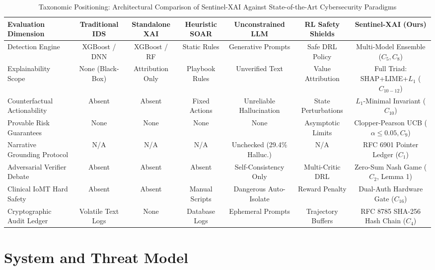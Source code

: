 \documentclass{ieeeaccess}
\begin{document}
\begin{table}[t]
\centering
\caption{Taxonomic Positioning: Architectural Comparison of Sentinel-XAI Against State-of-the-Art Cybersecurity Paradigms}
\label{tab:positioning}
\begin{tabular}{lcccccc}
\toprule
\textbf{Evaluation Dimension} & \textbf{Traditional IDS} & \textbf{Standalone XAI} & \textbf{Heuristic SOAR} & \textbf{Unconstrained LLM} & \textbf{RL Safety Shields} & \textbf{Sentinel-XAI (Ours)} \\
\midrule
Detection Engine & XGBoost / DNN & XGBoost / RF & Static Rules & Generative Prompts & Safe DRL Policy & Multi-Model Ensemble ($C_5, C_8$) \\
Explainability Scope & None (Black-Box) & Attribution Only & Playbook Rules & Unverified Text & Value Attribution & Full Triad: SHAP+LIME+$L_1$ ($C_{10-12}$) \\
Counterfactual Actionability & Absent & Absent & Fixed Actions & Unreliable Hallucination & State Perturbations & $L_1$-Minimal Invariant ($C_{10}$) \\
Provable Risk Guarantees & None & None & None & None & Asymptotic Limits & Clopper-Pearson UCB ($\alpha \le 0.05, C_9$) \\
Narrative Grounding Protocol & N/A & N/A & N/A & Unchecked (29.4\% Halluc.) & N/A & RFC 6901 Pointer Ledger ($C_1$) \\
Adversarial Verifier Debate & Absent & Absent & Absent & Self-Consistency Only & Multi-Critic DRL & Zero-Sum Nash Game ($C_2$, Lemma 1) \\
Clinical IoMT Hard Safety & Absent & Absent & Manual Scripts & Dangerous Auto-Isolate & Reward Penalty & Dual-Auth Hardware Gate ($C_{16}$) \\
Cryptographic Audit Ledger & Volatile Text Logs & None & Database Logs & Ephemeral Prompts & Trajectory Buffers & RFC 8785 SHA-256 Hash Chain ($C_4$) \\
\bottomrule
\end{tabular}
\end{table}

\section{System and Threat Model}
\label{sec:system_model}
\end{document}
